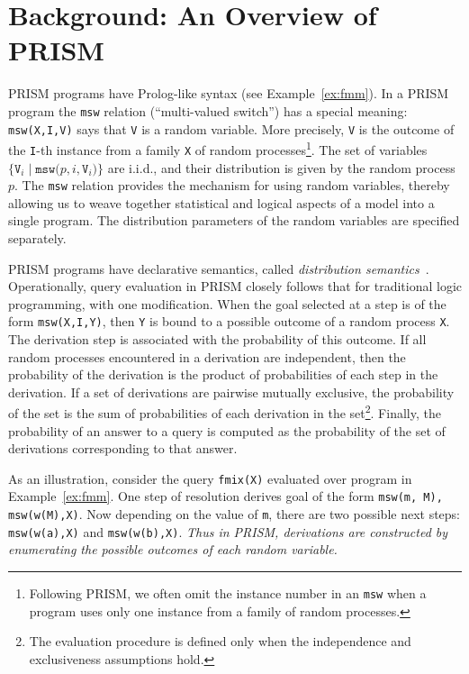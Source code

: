 \section{Background: An Overview of PRISM}
\label{sec:prism}


PRISM programs have Prolog-like syntax (see Example~\ref{ex:fmm}).
In a PRISM program the \texttt{msw} relation (``multi-valued switch'')
has a special meaning: \texttt{msw(X,I,V)} says that \texttt{V} is a
random variable.  More precisely, \texttt{V} is the outcome of the
\texttt{I}-th instance from a family \texttt{X} of random
processes\footnote{Following PRISM, we often omit the instance number
  in an \texttt{msw} when a program uses only one instance from a
  family of random processes.}.  The set of variables $\{\mathtt{V}_i
\mid \mathtt{msw(}p, i, \mathtt{V}_i\mathtt{)}\}$ are i.i.d., and
their distribution is given by the random process $p$.  The
\texttt{msw} relation provides the mechanism for using random
variables, thereby allowing us to weave together statistical and
logical aspects of a model into a single program.  The distribution
parameters of the random variables are specified separately.


PRISM programs have declarative semantics, called 
\emph{distribution semantics}~\cite{sato-kameya-prism,sato}.
Operationally,  query evaluation in PRISM closely follows that for
traditional logic programming, with one
modification.  When the goal selected at a step is of the form
\texttt{msw(X,I,Y)}, then \texttt{Y} is bound to a possible outcome of a
random process \texttt{X}.  The derivation step is
associated with the probability of this outcome.  If all random
processes encountered in a derivation are independent, then the
probability of the derivation is the product of probabilities of each
step in the derivation.  If a set of derivations are pairwise mutually
exclusive, the probability of the set is the sum of probabilities of
each derivation in the set\footnote{The evaluation procedure is
  defined only when the independence and exclusiveness assumptions
  hold.}.  
Finally, the probability of an answer to
a query is computed as the probability of the set of derivations
corresponding to that answer.  

As an illustration, consider the query \texttt{fmix(X)} evaluated over program in
Example~\ref{ex:fmm}.   One step of resolution derives goal of
the form \texttt{msw(m, M), msw(w(M),X)}. Now depending on the value of \texttt{m},
there are two possible next steps:
\texttt{msw(w(a),X)} and \texttt{msw(w(b),X)}.
\emph{Thus in PRISM, derivations are constructed by enumerating the
  possible outcomes of each random variable.}


